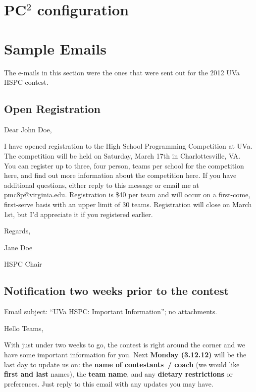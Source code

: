 \documentclass[11pt,twoside,letterpaper]{book}
\begin{document}
\cleardoublepage
\chapter{PC$^2$ configuration}
\label{appendix:pc2-config}



\cleardoublepage
\chapter{Sample Emails}

The e-mails in this section were the ones that were sent out for the
2012 UVa HSPC contest.

\section{Open Registration}

\noindent Dear John Doe,

\noindent I have opened registration to the High School Programming
Competition at UVa. The competition will be held on Saturday,
March 17th in Charlottesville, VA. You can register up to three,
four person, teams per school for the competition here, and find
out more information about the competition here. If you have
additional questions, either reply to this message or email me
at pmc8p@virginia.edu. Registration is \$40 per team and will
occur on a first-come, first-serve basis with an upper limit of
30 teams. Registration will close on March 1st, but I'd
appreciate it if you registered earlier.

\noindent Regards,

\noindent Jane Doe

\noindent HSPC Chair




\section{Notification two weeks prior to the contest}

Email subject: ``UVa HSPC: Important Information''; no attachments.

\noindent Hello Teams,

\noindent With just under two weeks to go, the contest is right around
the corner and we have some important information for you. Next {\bf
Monday (3.12.12)} will be the last day to update us on: the {\bf name
of contestants~/ coach} (we would like {\bf first and last} names),
the {\bf team name}, and any {\bf dietary restrictions} or
preferences. Just reply to this email with any updates you may have.
\end{document}

